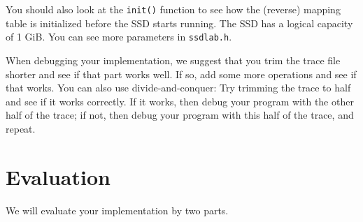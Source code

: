 \documentclass[11pt]{article}
\begin{document}
You should also look at the \texttt{init()} function to see how the (reverse) mapping table is initialized before the SSD starts running. The SSD has a logical capacity of 1 GiB. You can see more parameters in \texttt{ssdlab.h}.

When debugging your implementation, we suggest that you trim the trace file shorter and see if that part works well. 
If so, add some more operations and see if that works.
You can also use divide-and-conquer: Try trimming the trace to half and see if it works correctly. If it works, then debug your program with the other half of the trace; if not, then debug your program with this half of the trace, and repeat.

\section{Evaluation}
\label{sec:eval}
We will evaluate your implementation by two parts. 
\end{document}
